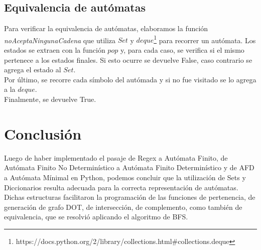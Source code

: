 \documentclass[a4paper, 10pt, twoside]{article}
\begin{document}
\subsection{Equivalencia de autómatas}
Para verificar la equivalencia de autómatas, elaboramos la función \textit{noAceptaNingunaCadena} que utiliza $Set$ y $deque$\footnote{https://docs.python.org/2/library/collections.html\#collections.deque} para recorrer un autómata. Los estados se extraen con la función $pop$ y, para cada caso, se verifica si el mismo pertenece a los estados finales. Si esto ocurre se devuelve False, caso contrario se agrega el estado al $Set$.\\
Por último, se recorre cada símbolo del autómada y si no fue visitado se lo agrega a la $deque$.\\
Finalmente, se devuelve True.

\newpage
\section{Conclusión}
Luego de haber implementado el pasaje de Regex a Autómata Finito, de Autómata Finito No Determinístico a Autómata Finito Determinístico y de AFD a Autómata Mínimal en Python, podemos concluir que la utilización de Sets y Diccionarios resulta adecuada para la correcta representación de autómatas. Dichas estructuras facilitaron la programación de las funciones de pertenencia, de generación de grafo DOT, de intersección, de complemento, como también de equivalencia, que se resolvió aplicando el algoritmo de BFS.
\end{document}
